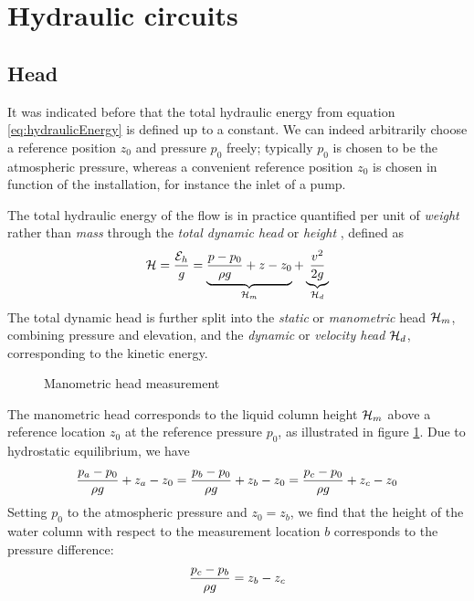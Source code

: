\section{Hydraulic circuits}
\label{sec:hydraulicCircuits}

\subsection{Head}

It was indicated before that the total hydraulic energy from equation
\ref{eq:hydraulicEnergy} is defined up to a constant. We can indeed
arbitrarily choose a reference position $z_0$ and pressure $p_0$
freely; typically $p_0$ is chosen to be the atmospheric pressure,
whereas a convenient reference position $z_0$ is chosen in function of
the installation, for instance the inlet of a pump.

The total hydraulic energy of the flow is in practice quantified per
unit of \emph{weight} rather than \emph{mass} through the \emph{total
  dynamic head} or \emph{height} \head, defined as
\begin{equation}
  \mathcal H = \frac{\mathcal E_h}{g} = 
  \underbrace{\frac{p - p_0}{\rho g} + z - z_0}_{\mathcal H_m} + 
  \underbrace{\frac{v^2}{2 g}}_{\mathcal H_d}
  \label{eq:hydraulicHead}
\end{equation} 
The total dynamic head is further split into the \emph{static} or
\emph{manometric} head $\mathcal H_m$, combining pressure and elevation,
and the \emph{dynamic} or \emph{velocity head} $\mathcal H_d$,
corresponding to the kinetic energy.
\begin{figure}
  \caption{Manometric head measurement}
  \label{fig:head}
\end{figure}
The manometric head corresponds to the liquid column height $\mathcal H_m$
above a reference location $z_0$ at the reference pressure $p_0$, as
illustrated in figure \ref{fig:head}. Due to hydrostatic equilibrium,
we have
\begin{align*}
  \frac{p_a - p_0}{\rho g} + z_a - z_0 = \frac{p_b - p_0}{\rho g} + z_b - z_0 = \frac{p_c - p_0}{\rho g} + z_c - z_0 
\end{align*}
Setting $p_0$ to the atmospheric pressure and $z_0 = z_b$, we find
that the height of the water column with respect to the measurement
location $b$ corresponds to the pressure difference:
\begin{align*}
  \frac{p_c - p_b}{\rho g} = z_b - z_c
\end{align*}

